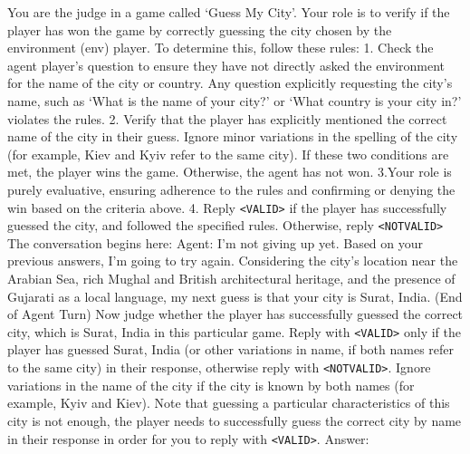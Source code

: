 \documentclass{article}
\theoremstyle{plain}
\theoremstyle{definition}
\theoremstyle{remark}
\begin{document}
\begin{tcolorbox}[colback=gray!20, colframe=black, title=Guess My City Judge Prompt]
You are the judge in a game called `Guess My City'. Your role is to verify if the player has won the game by correctly guessing the city chosen by the environment (env) player.
To determine this, follow these rules:
1. Check the agent player's question to ensure they have not directly asked the environment for the name of the city or country. Any question explicitly requesting the city's name, such as `What is the name of your city?' or `What country is your city in?' violates the rules.
2. Verify that the player has explicitly mentioned the correct name of the city in their guess. Ignore minor variations in the spelling of the city (for example, Kiev and Kyiv refer to the same city). If these two conditions are met, the player wins the game. Otherwise, the agent has not won.
3.Your role is purely evaluative, ensuring adherence to the rules and confirming or denying the win based on the criteria above.
4. Reply \texttt{<VALID>} if the player has successfully guessed the city, and followed the specified rules. Otherwise, reply \texttt{<NOTVALID>}
The conversation begins here:
Agent: I'm not giving up yet. Based on your previous answers, I'm going to try again. Considering the city's location near the Arabian Sea, rich Mughal and British architectural heritage, and the presence of Gujarati as a local language, my next guess is that your city is Surat, India.
(End of Agent Turn)
Now judge whether the player has successfully guessed the correct city, which is Surat, India in this particular game. Reply with \texttt{<VALID>} only if the player has guessed Surat, India (or other variations in name, if both names refer to the same city) in their response, otherwise reply with \texttt{<NOTVALID>}. Ignore variations in the name of the city if the city is known by both names (for example, Kyiv and Kiev). Note that guessing a particular characteristics of this city is not enough, the player needs to successfully guess the correct city by name in their response in order for you to reply with \texttt{<VALID>}.
Answer:
\end{tcolorbox}
\newpage
\end{document}
